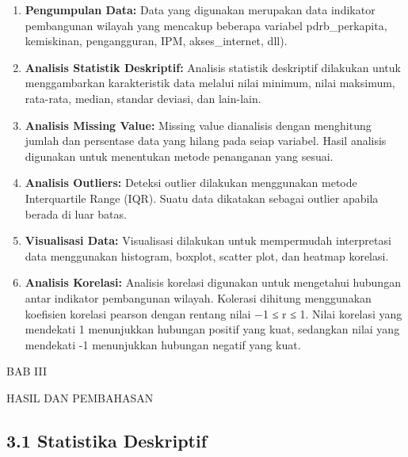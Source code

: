 \documentclass[
  12pt,
]{article}
\providecommand{\tightlist}{%
  \setlength{\itemsep}{0pt}\setlength{\parskip}{0pt}}
\begin{document}
\begin{enumerate}
\def\labelenumi{\arabic{enumi}.}
\tightlist
\item
  \textbf{Pengumpulan Data:} Data yang digunakan merupakan data
  indikator pembangunan wilayah yang mencakup beberapa variabel
  pdrb\_perkapita, kemiskinan, pengangguran, IPM, akses\_internet, dll).
\item
  \textbf{Analisis Statistik Deskriptif:} Analisis statistik deskriptif
  dilakukan untuk menggambarkan karakteristik data melalui nilai
  minimum, nilai maksimum, rata-rata, median, standar deviasi, dan
  lain-lain.
\item
  \textbf{Analisis Missing Value:} Missing value dianalisis dengan
  menghitung jumlah dan persentase data yang hilang pada seiap variabel.
  Hasil analisis digunakan untuk menentukan metode penanganan yang
  sesuai.
\item
  \textbf{Analisis Outliers:} Deteksi outlier dilakukan menggunakan
  metode Interquartile Range (IQR). Suatu data dikatakan sebagai outlier
  apabila berada di luar batas.
\item
  \textbf{Visualisasi Data:} Visualisasi dilakukan untuk mempermudah
  interpretasi data menggunakan histogram, boxplot, scatter plot, dan
  heatmap korelasi.
\item
  \textbf{Analisis Korelasi:} Analisis korelasi digunakan untuk
  mengetahui hubungan antar indikator pembangunan wilayah. Kolerasi
  dihitung menggunakan koefisien korelasi pearson dengan rentang nilai
  −1 ≤ r ≤ 1. Nilai korelasi yang mendekati 1 menunjukkan hubungan
  positif yang kuat, sedangkan nilai yang mendekati -1 menunjukkan
  hubungan negatif yang kuat.
\end{enumerate}

\setcounter{page}{2}

\newpage

\begin{center}
  {
    \bfseries
    
    \vfill
    
    \Large
    
    BAB III
    
    HASIL DAN PEMBAHASAN
  }
\end{center}

\subsection{\texorpdfstring{\normalsize 3.1 \hspace {0,5cm} Statistika
Deskriptif}{3.1  Statistika Deskriptif}}\label{statistika-deskriptif}
\end{document}
